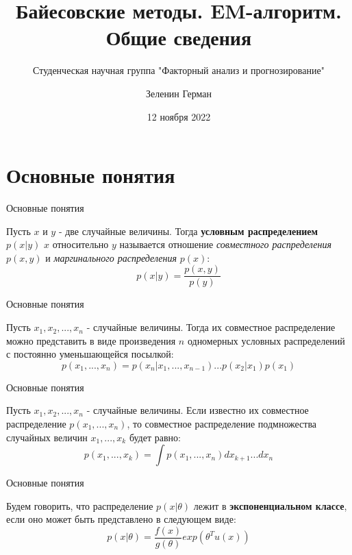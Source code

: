 \documentclass[russian]{vegapresentation}
\subtitle{Студенческая научная группа "Факторный анализ и прогнозирование"}
\title{Байесовские методы. EM-алгоритм. Общие сведения}
\author{Зеленин Герман}
\institute{Московский государственный университет, механико-математический факультет}
\date{12 ноября 2022}
\begin{document}
    \maketitle
    
    \section{Основные понятия}
    
    \begin{frame}{Основные понятия}
		\begin{definition}
			Пусть $x$ и $y$ - две случайные величины. Тогда \textbf{условным распределением} $p(x|y)$ $x$ относительно $y$ называется отношение \textit{совместного распределения} $p(x,y)$ и \textit{маргинального распределения} $p(x)$:
			\begin{equation}
				p(x|y) = \frac{p(x,y)}{p(y)}
			\end{equation}
		\end{definition}
    \end{frame}
    
    \begin{frame}{Основные понятия}
		\begin{theorem}
			Пусть $x_1,x_2,...,x_n$ - случайные величины. Тогда их совместное распределение можно представить в виде произведения $n$ одномерных условных распределений с постоянно уменьшающейся посылкой:
			\begin{equation}
				p(x_1, ..., x_n) = p(x_n|x_1, ..., x_{n-1})...p(x_2|x_1)p(x_1)
			\end{equation}
		\end{theorem}
    \end{frame}

    \begin{frame}{Основные понятия}
		\begin{theorem}
			Пусть $x_1,x_2,...,x_n$ - случайные величины. Если известно их совместное распределение $p(x_1, ..., x_n)$, то совместное распределение подмножества случайных величин $x_1, ..., x_k$ будет равно:
			\begin{equation}
				p(x_1, ..., x_k) = \int p(x_1, ..., x_n)dx_{k+1}...dx_n
			\end{equation}
		\end{theorem}
    \end{frame}
    
    \begin{frame}{Основные понятия}
		\begin{definition}
			Будем говорить, что распределение $p(x|\theta)$ лежит в \textbf{экспоненциальном классе}, если оно может быть представлено в следующем виде:
			\begin{equation}
				p(x|\theta) = \frac{f(x)}{g(\theta)}exp(\theta^Tu(x))
			\end{equation}
		\end{definition}
    \end{frame}
    
\end{document}
